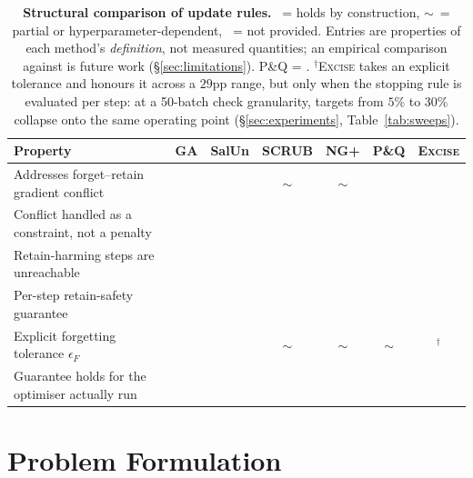 \documentclass{article}
\newcommand{\ours}{\textsc{Excise}}
\newcommand{\cmark}{{\color{green!60!black}\ding{51}}}
\newcommand{\xmark}{{\color{red!70!black}\ding{55}}}
\newcommand{\pmark}{{\color{orange!80!black}$\sim$}}
\theoremstyle{remark}
\theoremstyle{plain}
\begin{document}
\begin{table}[t]
\centering
\caption{\textbf{Structural comparison of update rules.} \cmark~= holds by
construction, \pmark~= partial or hyperparameter-dependent, \xmark~= not
provided. Entries are properties of each method's \emph{definition}, not
measured quantities; an empirical comparison against
\citet{patel2025learning} is future work (\S\ref{sec:limitations}).
P\&Q = \citet{patel2025learning}. $^\dagger$\ours{} takes an explicit tolerance
and honours it across a $29$pp range, but only when the stopping rule is
evaluated per step: at a 50-batch check granularity, targets from $5\%$ to
$30\%$ collapse onto the same operating point
(\S\ref{sec:experiments}, Table~\ref{tab:sweeps}).}
\label{tab:properties}
\begin{tabular}{@{}lcccccc@{}}
\toprule
\textbf{Property} & \textbf{GA} & \textbf{SalUn} & \textbf{SCRUB} &
\textbf{NG+} & \textbf{P\&Q} & \textbf{\ours{}} \\
\midrule
Addresses forget--retain gradient conflict & \xmark & \xmark & \pmark & \pmark & \cmark & \cmark \\
Conflict handled as a constraint, not a penalty & \xmark & \xmark & \xmark & \xmark & \xmark & \cmark \\
Retain-harming steps are unreachable & \xmark & \xmark & \xmark & \xmark & \xmark & \cmark \\
Per-step retain-safety guarantee & \xmark & \xmark & \xmark & \xmark & \xmark & \cmark \\
Explicit forgetting tolerance $\epsilon_F$ & \xmark & \xmark & \pmark & \pmark & \pmark & \cmark$^\dagger$ \\
Guarantee holds for the optimiser actually run & \xmark & \xmark & \xmark & \xmark & \xmark & \cmark \\
\bottomrule
\end{tabular}
\end{table}

\section{Problem Formulation}\label{sec:problem}
\end{document}
